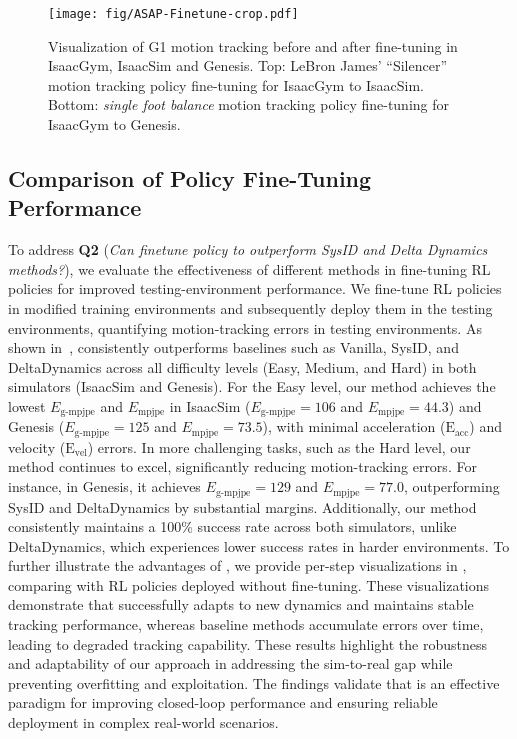 \begin{figure*}[t]
    \centering
    \texttt{[image: fig/ASAP-Finetune-crop.pdf]}    \caption{Visualization of G1 motion tracking before and after \method fine-tuning in IsaacGym, IsaacSim and Genesis. Top: LeBron James’ “Silencer” motion tracking policy fine-tuning for IsaacGym to IsaacSim. Bottom: \textit{single foot balance} motion tracking policy fine-tuning for IsaacGym to Genesis.}
    \vspace{-2mm}
    \label{fig:ASAP_sim_close_loop}
\end{figure*}




\subsection{Comparison of Policy Fine-Tuning Performance}
\label{sec:sim-close-loop}
To address \textbf{Q2} (\textit{Can \method finetune policy to outperform SysID and Delta Dynamics methods?}), we evaluate the effectiveness of different methods in fine-tuning RL policies for improved testing-environment performance. 
We fine-tune RL policies in modified training environments and subsequently deploy them in the testing environments, quantifying motion-tracking errors in testing environments.
As shown in~, \method consistently outperforms baselines such as Vanilla, SysID, and DeltaDynamics across all difficulty levels (Easy, Medium, and Hard) in both simulators (IsaacSim and Genesis). For the Easy level, our method achieves the lowest $E_\text{g-mpjpe}$ and $E_\text{mpjpe}$ in IsaacSim ($E_\text{g-mpjpe} = 106$ and $E_\text{mpjpe} = 44.3$) and Genesis ($E_\text{g-mpjpe} = 125$ and $E_\text{mpjpe} = 73.5$), with minimal acceleration ($\text{E}_{\text{acc}}$) and velocity ($\text{E}_{\text{vel}}$) errors. In more challenging tasks, such as the Hard level, our method continues to excel, significantly reducing motion-tracking errors. For instance, in Genesis, it achieves $E_\text{g-mpjpe} = 129$ and $E_\text{mpjpe} = 77.0$, outperforming SysID and DeltaDynamics by substantial margins. Additionally, our method consistently maintains a 100\% success rate across both simulators, unlike DeltaDynamics, which experiences lower success rates in harder environments. 
To further illustrate the advantages of \method, we provide per-step visualizations in , comparing \method with RL policies deployed without fine-tuning. These visualizations demonstrate that \method successfully adapts to new dynamics and maintains stable tracking performance, whereas baseline methods accumulate errors over time, leading to degraded tracking capability.
These results highlight the robustness and adaptability of our approach in addressing the sim-to-real gap while preventing overfitting and exploitation. The findings validate that \method is an effective paradigm for improving closed-loop performance and ensuring reliable deployment in complex real-world scenarios.




